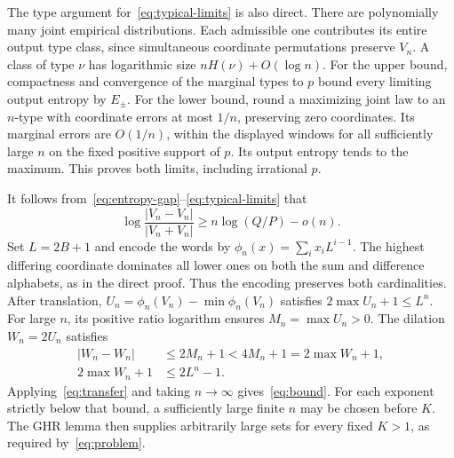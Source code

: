 \documentclass[11pt,a4paper]{article}
\begin{document}
The type argument for~\eqref{eq:typical-limits} is also direct. There are
polynomially many joint empirical distributions. Each admissible one
contributes its entire output type class, since simultaneous coordinate
permutations preserve $V_n$. A class of type $\nu$ has logarithmic size
$nH(\nu)+O(\log n)$. For the upper bound, compactness and convergence of
the marginal types to $p$ bound every limiting output entropy by $E_\pm$.
For the lower bound, round a maximizing joint law to an $n$-type with
coordinate errors at most $1/n$, preserving zero coordinates. Its marginal
errors are $O(1/n)$, within the displayed windows for all sufficiently
large $n$ on the fixed positive support of $p$. Its output entropy tends
to the maximum. This proves both limits, including irrational $p$.

It follows from~\eqref{eq:entropy-gap}--\eqref{eq:typical-limits} that
\[
 \log\frac{|V_n-V_n|}{|V_n+V_n|}
 \ge n\log(Q/P)-o(n).
\]
Set $L=2B+1$ and encode the words by
$\phi_n(x)=\sum_i x_iL^{i-1}$. The highest differing coordinate dominates
all lower ones on both the sum and difference alphabets, as in the
direct proof. Thus the encoding preserves both cardinalities. After
translation, $U_n=\phi_n(V_n)-\min\phi_n(V_n)$ satisfies
$2\max U_n+1\le L^n$. For large $n$, its positive ratio logarithm ensures
$M_n=\max U_n>0$. The dilation $W_n=2U_n$ satisfies
\begin{align*}
 |W_n-W_n|&\le2M_n+1<4M_n+1=2\max W_n+1,\\
 2\max W_n+1&\le2L^n-1.
\end{align*}
Applying~\eqref{eq:transfer} and taking $n\to\infty$ gives~\eqref{eq:bound}.
For each exponent strictly below that bound, a sufficiently large finite
$n$ may be chosen before $K$. The GHR lemma then supplies arbitrarily
large sets for every fixed $K>1$, as required by~\eqref{eq:problem}.
\end{document}
